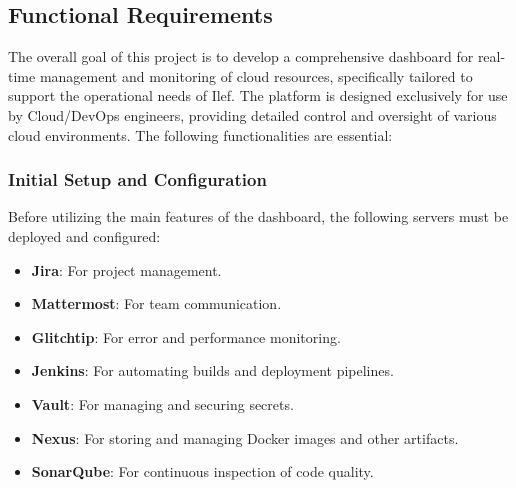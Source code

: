 \subsection{Functional Requirements}
The overall goal of this project is to develop a comprehensive dashboard for real-time management and monitoring of cloud resources, specifically tailored to support the operational needs of Ilef. The platform is designed exclusively for use by Cloud/DevOps engineers, providing detailed control and oversight of various cloud environments. The following functionalities are essential:

\subsubsection{Initial Setup and Configuration}
Before utilizing the main features of the dashboard, the following servers must be deployed and configured:
\begin{itemize}
    \item \textbf{Jira}: For project management.
    \item \textbf{Mattermost}: For team communication.
    \item \textbf{Glitchtip}: For error and performance monitoring.
    \item \textbf{Jenkins}: For automating builds and deployment pipelines.
    \item \textbf{Vault}: For managing and securing secrets.
    \item \textbf{Nexus}: For storing and managing Docker images and other artifacts.
    \item \textbf{SonarQube}: For continuous inspection of code quality.
\end{itemize}

